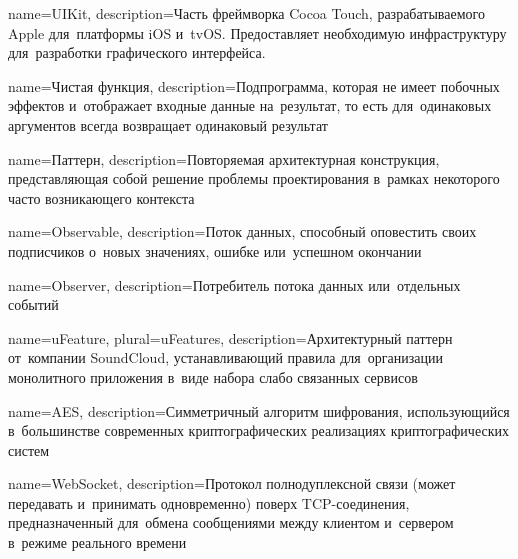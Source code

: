 




{
  name={UIKit},
  description={Часть фреймворка Cocoa Touch, разрабатываемого Apple для~платформы iOS и~tvOS. Предоставляет необходимую инфраструктуру для~разработки графического интерфейса.}
}

{
  name={Чистая функция},
  description={Подпрограмма, которая не имеет побочных эффектов и~отображает входные данные на~результат, то есть для~одинаковых аргументов всегда возвращает одинаковый результат}
}

{
  name={Паттерн},
  description={Повторяемая архитектурная конструкция, представляющая собой решение проблемы проектирования в~рамках некоторого часто возникающего контекста}
}

{
  name=Observable,
  description={Поток данных, способный оповестить своих подписчиков о~новых значениях, ошибке или~успешном окончании}
}

{
  name=Observer,
  description={Потребитель потока данных или~отдельных событий}
}

{
  name=uFeature,
  plural={uFeatures},
  description={Архитектурный паттерн от~компании SoundCloud, устанавливающий правила для~организации монолитного приложения в~виде набора слабо связанных сервисов}
}

{
  name=AES,
  description={Симметричный алгоритм шифрования, использующийся в~большинстве современных криптографических реализациях криптографических систем}
}

{
  name=WebSocket,
  description={Протокол полнодуплексной связи (может передавать и~принимать одновременно) поверх TCP-соединения, предназначенный для~обмена сообщениями между клиентом и~сервером в~режиме реального времени}
}


\glsaddall


